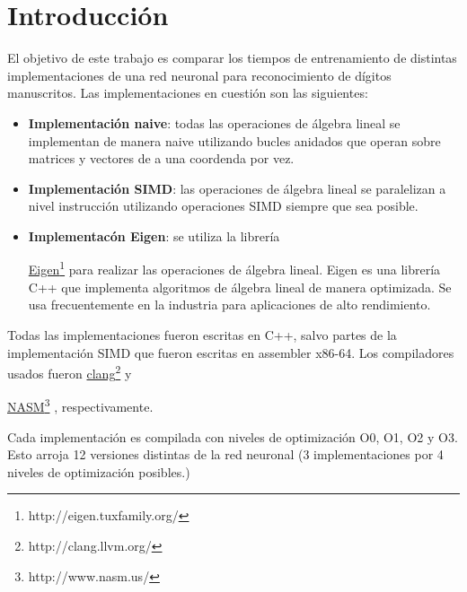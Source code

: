 \documentclass[a4paper, 10pt, twoside]{article}
\newcommand{\link}[2]{
  \href{#1}{#2}\footnote{#1}
}
\begin{document}
\newpage




\tableofcontents

\newpage




\section{Introducción}

El objetivo de este trabajo es comparar los tiempos de entrenamiento de
distintas implementaciones de una red neuronal para reconocimiento de dígitos
manuscritos. Las implementaciones en cuestión son las siguientes:

\begin{itemize}
  \item \textbf{Implementación naive}: todas las operaciones de álgebra lineal
    se implementan de manera naive utilizando bucles anidados que operan sobre
    matrices y vectores de a una coordenda por vez.

  \item \textbf{Implementación SIMD}: las operaciones de álgebra lineal se
    paralelizan a nivel instrucción utilizando operaciones SIMD siempre que sea
    posible.

  \item \textbf{Implementacón Eigen}: se utiliza la librería
    \link{http://eigen.tuxfamily.org/}{Eigen} para realizar las operaciones de
    álgebra lineal. Eigen es una librería C++ que implementa algoritmos de
    álgebra lineal de manera optimizada. Se usa frecuentemente en la industria
    para aplicaciones de alto rendimiento.
\end{itemize}

Todas las implementaciones fueron escritas en C++, salvo partes de la
implementación SIMD que fueron escritas en assembler x86-64. Los compiladores
usados fueron \link{http://clang.llvm.org/}{clang} y
\link{http://www.nasm.us/}{NASM}, respectivamente.

Cada implementación es compilada con niveles de optimización O0, O1, O2 y O3.
Esto arroja 12 versiones distintas de la red neuronal (3 implementaciones por 4
niveles de optimización posibles.)
\end{document}

